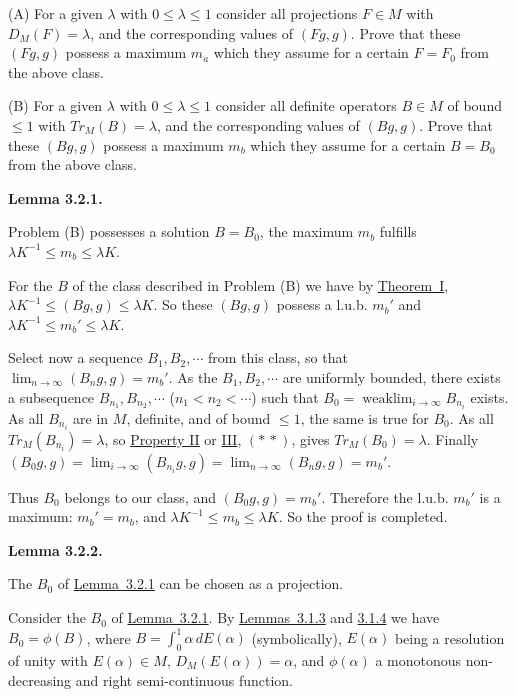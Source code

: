 \documentclass[twoside,leqno]{article}
\newcommand{\TrM}{Tr_M}
\newcommand{\StatementTarget}[1]{\phantomsection\hypertarget{stmt:#1}{}}
\newcommand{\StatementRef}[2]{\hyperlink{stmt:#1}{#2}}
\newcommand{\EquationRef}[2]{\hyperlink{eq:#1}{#2}}
\newenvironment{statement}[2]{%
  \par\medskip
  \noindent\StatementTarget{#1}\hspace*{\parindent}\textbf{#2.}\ \itshape\ignorespaces
}{\par}
\begin{document}
\indent\ignorespaces
(A) For a given $\lambda$ with $0\leq\lambda\leq1$ consider all projections
$F\in M$ with $D_M(F)=\lambda$, and the corresponding values of $(Fg,g)$.
Prove that these $(Fg,g)$ possess a maximum $m_a$ which they assume for a
certain $F=F_0$ from the above class.

\indent\ignorespaces
(B) For a given $\lambda$ with $0\leq\lambda\leq1$ consider all definite
operators $B\in M$ of bound $\leq1$ with $\TrM(B)=\lambda$,
and the corresponding values of $(Bg,g)$. Prove that these $(Bg,g)$ possess
a maximum $m_b$ which they assume for a certain $B=B_0$ from the above
class.

\begin{statement}{lemma:3.2.1}{Lemma 3.2.1}
Problem (B) possesses a solution $B=B_0$, the maximum $m_b$ fulfills
$\lambda K^{-1}\leq m_b\leq\lambda K$.
\end{statement}

For the $B$ of the class described in Problem (B) we have by
\StatementRef{theorem:I}{Theorem~I},
$\lambda K^{-1}\leq(Bg,g)\leq\lambda K$.
So these $(Bg,g)$ possess a l.u.b. $m_b'$ and
$\lambda K^{-1}\leq m_b'\leq\lambda K$.

Select now a sequence $B_1,B_2,\cdots$ from this class, so that
$\lim_{n\to\infty}(B_ng,g)=m_b'$. As the $B_1,B_2,\cdots$ are uniformly
bounded, there exists a subsequence $B_{n_1},B_{n_2},\cdots$
($n_1<n_2<\cdots$) such that
$B_0=\mathop{\mathrm{weak}\lim}_{i\to\infty}B_{n_i}$
exists. As all $B_{n_i}$ are in $M$, definite, and of bound $\leq1$, the
same is true for $B_0$. As all $\TrM(B_{n_i})=\lambda$, so
\StatementRef{property:II}{Property II} or
\StatementRef{property:III}{III},
\EquationRef{property:III:starstar}{$(*\,*)$}, gives $\TrM(B_0)=\lambda$.
Finally
$(B_0g,g)=\lim_{i\to\infty}(B_{n_i}g,g)
=\lim_{n\to\infty}(B_ng,g)=m_b'$.

Thus $B_0$ belongs to our class, and $(B_0g,g)=m_b'$. Therefore the l.u.b.
$m_b'$ is a maximum: $m_b'=m_b$, and
$\lambda K^{-1}\leq m_b\leq\lambda K$. So the proof is completed.

\begin{statement}{lemma:3.2.2}{Lemma 3.2.2}
The $B_0$ of \StatementRef{lemma:3.2.1}{Lemma~3.2.1} can be chosen as a
projection.
\end{statement}

Consider the $B_0$ of \StatementRef{lemma:3.2.1}{Lemma~3.2.1}. By
\StatementRef{lemma:3.1.3}{Lemmas~3.1.3} and
\StatementRef{lemma:3.1.4}{3.1.4} we have $B_0=\phi(B)$, where
$B=\int_0^1\alpha\,dE(\alpha)$ (symbolically),
$E(\alpha)$ being a resolution of unity with $E(\alpha)\in M$,
$D_M(E(\alpha))=\alpha$, and $\phi(\alpha)$ a monotonous non-decreasing and
right semi-continuous function.
\end{document}
